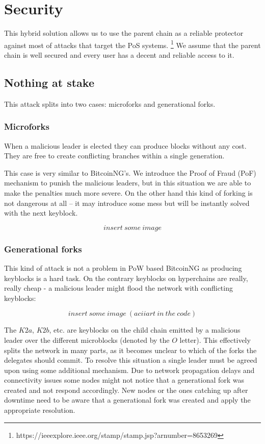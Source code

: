 \section{Security}

This hybrid solution allows us to use the parent chain as a
reliable protector against most of attacks that target the PoS systems.
\footnote{https://ieeexplore.ieee.org/stamp/stamp.jsp?arnumber=8653269}
We assume that the parent chain is well secured and every user has a decent
and reliable access to it.

\subsection{Nothing at stake}

This attack splits into two cases: microforks and generational forks.

\subsubsection{Microforks}

When a malicious leader is elected they can produce blocks without any cost.
They are free to create conflicting branches within a single generation.

This case is very similar to BitcoinNG's. We introduce the Proof of Fraud (PoF)
mechanism to punish the malicious leaders, but in this situation we are able to
make the penalties much more severe. On the other hand this kind of forking is
not dangerous at all – it may introduce some mess but will be instantly solved
with the next keyblock.

$$insert\ some\ image$$

\subsubsection{Generational forks}

This kind of attack is not a problem in PoW based BitcoinNG as producing
keyblocks is a hard task. On the contrary keyblocks on hyperchains are really,
really cheap - a malicious leader might flood the network with conflicting
keyblocks:

$$insert\ some\ image\ (aciiart\ in\ the\ code)$$

The $K2a$, $K2b$, etc. are keyblocks on the child chain emitted by a malicious
leader over the different microblocks (denoted by the $O$ letter). This
effectively splits the network in many parts, as it becomes unclear to which of
the forks the delegates should commit. To resolve this situation a single leader
must be agreed upon using some additional mechanism. Due to network propagation
delays and connectivity issues some nodes might not notice that a generational
fork was created and not respond accordingly. New nodes or the ones catching up
after downtime need to be aware that a generational fork was created and apply
the appropriate resolution.


